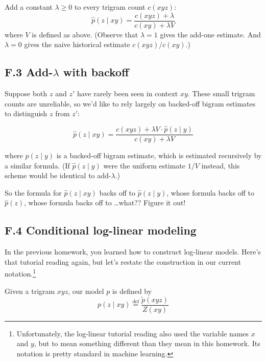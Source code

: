 Add a constant $\lambda \geq 0$ to every trigram count $c(xyz)$:  
\begin{equation}
\hat{p}(z \mid xy) = \frac{c(xyz)+\lambda}{c(xy)+\lambda V}
\end{equation}  
where $V$ is defined as above. (Observe that $\lambda=1$ gives the add-one estimate. And $\lambda=0$ gives the naive 
historical estimate $c(xyz)/c(xy)$.)  

\subsection*{F.3 \quad Add-$\lambda$ with backoff}

Suppose both $z$ and $z'$ have rarely been seen in context $xy$. These small trigram counts are unreliable, so 
we’d like to rely largely on backed-off bigram estimates to distinguish $z$ from $z'$:  

\begin{equation}
\hat{p}(z \mid xy) = \frac{c(xyz)+\lambda V \cdot \hat{p}(z \mid y)}{c(xy)+\lambda V}
\end{equation}  

where $\hat{p}(z \mid y)$ is a backed-off bigram estimate, which is estimated recursively by a similar formula. (If 
$\hat{p}(z \mid y)$ were the uniform estimate $1/V$ instead, this scheme would be identical to add-$\lambda$.)  

So the formula for $\hat{p}(z \mid xy)$ backs off to $\hat{p}(z \mid y)$, whose formula backs off to $\hat{p}(z)$, whose formula 
backs off to \dots what?? Figure it out!  

\subsection*{F.4 \quad Conditional log-linear modeling}

In the previous homework, you learned how to construct log-linear models. Here’s that tutorial reading 
again, but let’s restate the construction in our current notation.\footnote{Unfortunately, the log-linear tutorial reading also used the variable names $x$ and $y$, but to mean something different than they mean in this homework. Its notation is pretty standard in machine learning.}  

Given a trigram $xyz$, our model $p$ is defined by  
\begin{equation}
p(z \mid xy) \overset{\text{def}}{=} \frac{\tilde{p}(xyz)}{Z(xy)}
\end{equation}  

